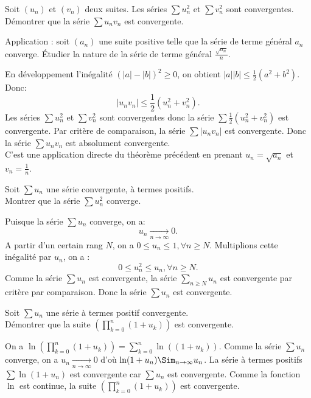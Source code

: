\documentclass{book}
\begin{document}
\begin{Exercice}
Soit $(u_n)$ et $(v_n)$ deux suites. Les séries $\sum u_n ^2$ et $\sum v_n ^2$ sont convergentes.\\ 
Démontrer que la série $\sum u_n v_n$ est convergente.




Application : soit $(a_n)$ une suite positive telle que la série de terme général $a_n$ converge. Étudier la nature de la série de terme général $\frac{\sqrt{a_n}}{n}$.
\begin{Correction}
En développement l'inégalité $(|a|-|b|)^2\geq 0$, on obtient $|a||b|\leq \frac{1}{2}(a^2+b^2)$. Donc: 
$$|u_nv_n|\leq  \frac{1}{2}(u_n^2+v_n^2).$$
Les séries $\sum u_n ^2$ et $\sum v_n ^2$ sont convergentes donc la série $\sum \frac{1}{2}(u_n^2+v_n^2)$ est convergente. Par critère de comparaison, la série $\sum |u_nv_n| $ est convergente. Donc la série $\sum u_nv_n $ est absolument convergente.\\
C'est une application directe du théorème précédent en prenant $u_n=\sqrt{a_n}$ et $v_n=\frac{1}{n}$. 
\end{Correction}
\end{Exercice}

\begin{Exercice}[convergence]
Soit $\sum u_n$  une série convergente, à 
termes positifs.\\ 
Montrer que la série $\sum u_n^2$ converge. 
\begin{Correction}
Puisque la série  $\sum u_n$ converge, on a: 
$$ u_n \xrightarrow[n\to\infty]{}0.$$ 
A partir d'un certain rang $N$, on a  $0 \leq u_n \leq 1 ,\forall n\geq N.$  
Multiplions cette inégalité par $u_n$, on a :
$$0 \leq u_n^2 \leq u_n ,\forall n\geq N.$$
Comme la série $\sum u_n$ est convergente, la série $\sum_{n\geq N} u_n$ est convergente par critère par comparaison. Donc la série $\sum u_n$  est convergente.
\end{Correction}
\end{Exercice}

\begin{Exercice}[Convergence]
Soit $\sum u_n$ une série à termes positif convergente.\\ 
Démontrer que la suite $\left(\prod_{k=0}^n (1+u_k)\right)$ est convergente.
\begin{Correction}
On a $\ln(\prod_{k=0}^n (1+u_k))=\sum_{k=0}^n \ln( (1+u_k))$. 
Comme la série $\sum u_n$ converge, on a $u_n\xrightarrow[n\to\infty]{}0$ d'où $\ln(1+u_n)\Sim_{n\to\infty}u_n$. La série à  termes positifs  $\sum \ln (1+u_n)$ est convergente car $\sum u_n$ est convergente. Comme la fonction $\ln$ est continue, la suite $\left(\prod_{k=0}^n (1+u_k)\right)$ est convergente.
\end{Correction}
\end{Exercice}
\end{document}
